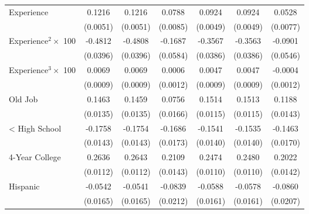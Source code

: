 {\begin{longtable}{l*{6}{c}}
Experience          &      0.1216\sym{***}&      0.1216\sym{***}&      0.0788\sym{***}&      0.0924\sym{***}&      0.0924\sym{***}&      0.0528\sym{***}\\
                    &    (0.0051)         &    (0.0051)         &    (0.0085)         &    (0.0049)         &    (0.0049)         &    (0.0077)         \\
Experience$^2\times$ 100&     -0.4812\sym{***}&     -0.4808\sym{***}&     -0.1687\sym{***}&     -0.3567\sym{***}&     -0.3563\sym{***}&     -0.0901\sym{*}  \\
                    &    (0.0396)         &    (0.0396)         &    (0.0584)         &    (0.0386)         &    (0.0386)         &    (0.0546)         \\
Experience$^3\times$ 100&      0.0069\sym{***}&      0.0069\sym{***}&      0.0006         &      0.0047\sym{***}&      0.0047\sym{***}&     -0.0004         \\
                    &    (0.0009)         &    (0.0009)         &    (0.0012)         &    (0.0009)         &    (0.0009)         &    (0.0012)         \\
Old Job             &      0.1463\sym{***}&      0.1459\sym{***}&      0.0756\sym{***}&      0.1514\sym{***}&      0.1513\sym{***}&      0.1188\sym{***}\\
                    &    (0.0135)         &    (0.0135)         &    (0.0166)         &    (0.0115)         &    (0.0115)         &    (0.0143)         \\
< High School       &     -0.1758\sym{***}&     -0.1754\sym{***}&     -0.1686\sym{***}&     -0.1541\sym{***}&     -0.1535\sym{***}&     -0.1463\sym{***}\\
                    &    (0.0143)         &    (0.0143)         &    (0.0173)         &    (0.0140)         &    (0.0140)         &    (0.0170)         \\
4-Year College      &      0.2636\sym{***}&      0.2643\sym{***}&      0.2109\sym{***}&      0.2474\sym{***}&      0.2480\sym{***}&      0.2022\sym{***}\\
                    &    (0.0112)         &    (0.0112)         &    (0.0143)         &    (0.0110)         &    (0.0110)         &    (0.0142)         \\
Hispanic            &     -0.0542\sym{***}&     -0.0541\sym{***}&     -0.0839\sym{***}&     -0.0588\sym{***}&     -0.0578\sym{***}&     -0.0860\sym{***}\\
                    &    (0.0165)         &    (0.0165)         &    (0.0212)         &    (0.0161)         &    (0.0161)         &    (0.0207)         \\

\end{longtable}}
